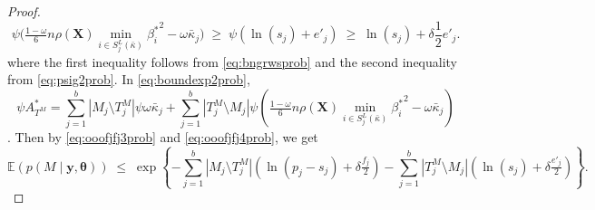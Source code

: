 \documentclass[
  12pt]{article}
\newcommand{\E}{\mathbb{E}}
\newcommand{\by}{\mathbf{y}}
\newcommand{\btheta}{\boldsymbol{\theta}}
\newcommand{\bX}{\mathbf{X}}
\begin{document}
\begin{proof}
\begin{equation}\label{eq:ooofjfj4prob}
\psi\bigg(\tfrac{1-\omega}{6} n \rho(\bX) \min_{i\in S^{L}_j(\bar{\kappa})}{\beta^*_i}^{2} - \omega\bar{\kappa}_j\bigg) \;\geq\; \psi\left(\ln(s_j)+e'_j\right) \;\geq\; \ln(s_j)+\delta \frac{1}{2}e'_j.
\end{equation}
where the first inequality follows from \eqref{eq:bngrwsprob} and the second inequality from \eqref{eq:psig2prob}. In \eqref{eq:boundexp2prob}, $$\psi A^*_{T^M}=\sum_{j=1}^b|M_j \setminus T^M_j|\psi\omega\bar{\kappa}_j + \sum_{j=1}^b |T^M_j \setminus M_j|\psi\left(\tfrac{1-\omega}{6} n \rho(\bX) \min_{i\in S^{L}_j(\bar{\kappa})}{\beta^*_i}^{2} - \omega\bar{\kappa}_j\right)$$. Then by \eqref{eq:ooofjfj3prob} and \eqref{eq:ooofjfj4prob}, we get
\begin{equation}\label{eq:fyv22}
\E(p(M\mid \by, \btheta))\;\leq\;\exp\left\{- \sum_{j=1}^b |M_j\setminus T^M_j|(\ln(p_j-s_j)+\delta \tfrac{f_j}{2})-\sum_{j=1}^b |T^M_j\setminus M_j|(\ln(s_j)+\delta \tfrac{e'_j}{2})\right\}.
\end{equation}


\end{proof}
\end{document}
